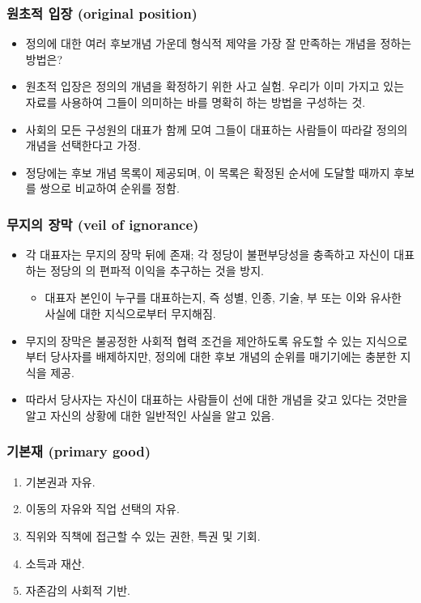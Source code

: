 \documentclass[aspectratio=169,xcolor=dvipsnames,handout]{beamer}
\begin{document}
\begin{frame}[<+->]
\frametitle{원초적 입장 (original position)}
    \begin{itemize}
        \item 정의에 대한 여러 후보개념 가운데 형식적 제약을 가장 잘 만족하는 개념을 정하는 방법은?
        \item 원초적 입장은 정의의 개념을 확정하기 위한 사고 실험. 우리가 이미 가지고 있는 자료를 사용하여 그들이 의미하는 바를 명확히 하는 방법을 구성하는 것.
        \item 사회의 모든 구성원의 대표가 함께 모여 그들이 대표하는 사람들이 따라갈 정의의 개념을 선택한다고 가정.
        \item 정당에는 후보 개념 목록이 제공되며, 이 목록은 확정된 순서에 도달할 때까지 후보를 쌍으로 비교하여 순위를 정함.
    \end{itemize}
\end{frame}

\begin{frame}
\frametitle{무지의 장막 (veil of ignorance)}
    \begin{itemize}
        \item 각 대표자는 무지의 장막 뒤에 존재; 각 정당이 불편부당성을 충족하고 자신이 대표하는 정당의 의 편파적 이익을 추구하는 것을 방지.
        \begin{itemize}
            \item 대표자 본인이 누구를 대표하는지, 즉 성별, 인종, 기술, 부 또는 이와 유사한 사실에 대한 지식으로부터 무지해짐.
        \end{itemize}
        \item 무지의 장막은 불공정한 사회적 협력 조건을 제안하도록 유도할 수 있는 지식으로부터 당사자를 배제하지만, 정의에 대한 후보 개념의 순위를 매기기에는 충분한 지식을 제공.
        \item 따라서 당사자는 자신이 대표하는 사람들이 선에 대한 개념을 갖고 있다는 것만을 알고 자신의 상황에 대한 일반적인 사실을 알고 있음.
    \end{itemize}
\end{frame}

\begin{frame}[<+->]
\frametitle{기본재 (primary good)}
    \begin{enumerate}
            \item  기본권과 자유.
            \item  이동의 자유와 직업 선택의 자유.
            \item  직위와 직책에 접근할 수 있는 권한, 특권 및 기회.
            \item  소득과 재산.
            \item  자존감의 사회적 기반.
    \end{enumerate}
\end{frame}
\end{document}
